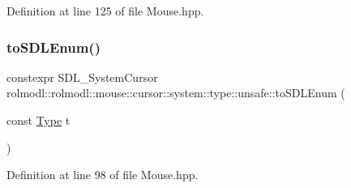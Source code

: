 Definition at line 125 of file Mouse.\+hpp.

\mbox{\label{namespacerolmodl_1_1rolmodl_1_1mouse_1_1cursor_1_1system_1_1type_1_1unsafe_a926ae05fe8978b0d7adce6a4fbeacc4e}} 
\subsubsection{\texorpdfstring{toSDLEnum()}{toSDLEnum()}}
{\footnotesize\ttfamily constexpr S\+D\+L\+\_\+\+System\+Cursor rolmodl\+::rolmodl\+::mouse\+::cursor\+::system\+::type\+::unsafe\+::to\+S\+D\+L\+Enum (\begin{DoxyParamCaption}\item[{const \mbox{\hyperlink{namespacerolmodl_1_1rolmodl_1_1mouse_1_1cursor_1_1system_a3446a710acf989c6fbce2397d43d6a33}{Type}}}]{t }\end{DoxyParamCaption})\hspace{0.3cm}{\ttfamily [noexcept]}}



Definition at line 98 of file Mouse.\+hpp.

